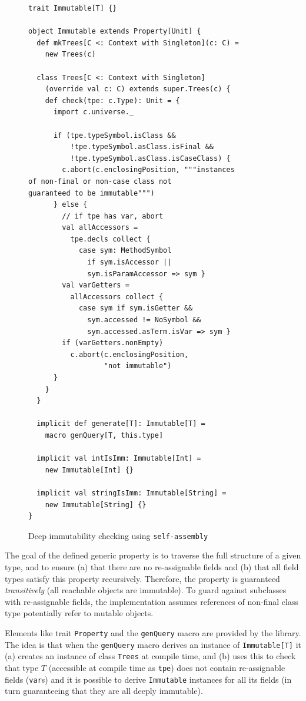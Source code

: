 \documentclass[preprint,nocopyrightspace]{sigplanconf}
\newcommand{\selfassembly}{\texttt{self-assembly~}}
\begin{document}

\begin{figure}
\centering
\begin{lstlisting}
trait Immutable[T] {}

object Immutable extends Property[Unit] {
  def mkTrees[C <: Context with Singleton](c: C) =
    new Trees(c)

  class Trees[C <: Context with Singleton]
    (override val c: C) extends super.Trees(c) {
    def check(tpe: c.Type): Unit = {
      import c.universe._

      if (tpe.typeSymbol.isClass &&
          !tpe.typeSymbol.asClass.isFinal &&
          !tpe.typeSymbol.asClass.isCaseClass) {
        c.abort(c.enclosingPosition, """instances
of non-final or non-case class not
guaranteed to be immutable""")
      } else {
        // if tpe has var, abort
        val allAccessors =
          tpe.decls collect {
            case sym: MethodSymbol
              if sym.isAccessor ||
              sym.isParamAccessor => sym }
        val varGetters =
          allAccessors collect {
            case sym if sym.isGetter &&
              sym.accessed != NoSymbol &&
              sym.accessed.asTerm.isVar => sym }
        if (varGetters.nonEmpty)
          c.abort(c.enclosingPosition,
                  "not immutable")
      }
    }
  }

  implicit def generate[T]: Immutable[T] =
    macro genQuery[T, this.type]

  implicit val intIsImm: Immutable[Int] =
    new Immutable[Int] {}

  implicit val stringIsImm: Immutable[String] =
    new Immutable[String] {}
}
\end{lstlisting}
  \caption{Deep immutability checking using \selfassembly}
  \label{fig:immutable}
\end{figure}

The goal of the defined generic property is to traverse the full structure of
a given type, and to ensure (a) that there are no re-assignable fields and (b)
that all field types satisfy this property recursively. Therefore, the property
is guaranteed {\em transitively} (all reachable objects are immutable). To
guard against subclasses with re-assignable fields, the implementation assumes
references of non-final class type potentially refer to mutable objects.

Elements like trait \verb|Property| and the \verb|genQuery| macro are provided
by the library. The idea is that when the \verb|genQuery| macro derives an
instance of \verb|Immutable[T]| it (a) creates an instance of class
\verb|Trees| at compile time, and (b) uses this to check that type $T$
(accessible at compile time as \verb|tpe|) does not contain re-assignable
fields (\verb|var|s) and it is possible to derive \verb|Immutable| instances
for all its fields (in turn guaranteeing that they are all deeply immutable).
\end{document}
